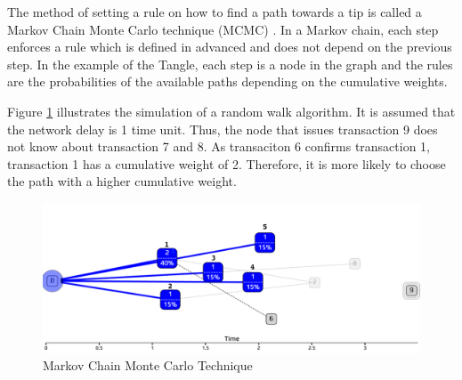 The method of setting a rule on how to find a path towards a tip is called a Markov Chain Monte Carlo technique (MCMC) \cite{mcmc}. In a Markov chain, each step enforces a rule which is defined in advanced and does not depend on the previous step. In the example of the Tangle, each step is a node in the graph and the rules are the probabilities of the available paths depending on the cumulative weights.

Figure \ref{fig:mcmc} illustrates the simulation of a random walk algorithm. It is assumed that the network delay is 1 time unit. Thus, the node that issues transaction 9 does not know about transaction 7 and 8. As transaciton 6 confirms transaction 1, transaction 1 has a cumulative weight of 2. Therefore, it is more likely to choose the path with a higher cumulative weight.

\begin{figure}[H]
    \centering
    \includegraphics[width=1.0\textwidth]{images/mcmc.png}
    \caption{Markov Chain Monte Carlo Technique}
    \label{fig:mcmc}
\end{figure}